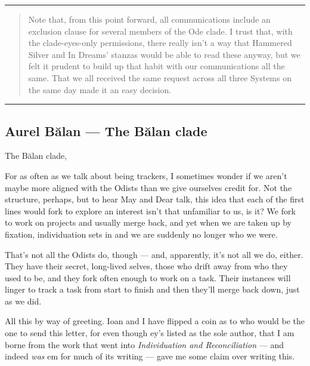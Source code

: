 \begin{center}\rule{0.5\linewidth}{0.5pt}\end{center}

\begin{quote}
Note that, from this point forward, all communications include an exclusion clause for several members of the Ode clade. I trust that, with the clade-eyes-only permissions, there really isn't a way that Hammered Silver and In Dreams' stanzas would be able to read these anyway, but we felt it prudent to build up that habit with our communications all the same. That we all received the same request across all three Systems on the same day made it an easy decision.
\end{quote}

\begin{center}\rule{0.5\linewidth}{0.5pt}\end{center}

\hypertarget{aurel-bux103lan-the-bux103lan-clade}{%
\subsection{Aurel Bălan — The Bălan clade}\label{aurel-bux103lan-the-bux103lan-clade}}

The Bălan clade,

For as often as we talk about being trackers, I sometimes wonder if we aren't maybe more aligned with the Odists than we give ourselves credit for. Not the structure, perhaps, but to hear May and Dear talk, this idea that each of the first lines would fork to explore an interest isn't that unfamiliar to us, is it? We fork to work on projects and usually merge back, and yet when we are taken up by fixation, individuation sets in and we are suddenly no longer who we were.

That's not all the Odists do, though — and, apparently, it's not all we do, either. They have their secret, long-lived selves, those who drift away from who they used to be, and they fork often enough to work on a task. Their instances will linger to track a task from start to finish and then they'll merge back down, just as we did.

All this by way of greeting. Ioan and I have flipped a coin as to who would be the one to send this letter, for even though ey's listed as the sole author, that I am borne from the work that went into \emph{Individuation and Reconciliation} — and indeed \emph{was} em for much of its writing — gave me some claim over writing this.

